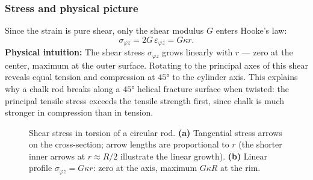 \documentclass[../main.tex]{subfiles}
\begin{document}
\subsubsection*{Stress and physical picture}

Since the strain is pure shear, only the shear modulus $G$ enters Hooke's law:
\begin{equation}
    \sigma_{\varphi z} = 2G\,\varepsilon_{\varphi z} = G\kappa r.
    \label{eq:lec08_torsion_stress}
\end{equation}
\noindent\textbf{Physical intuition:} The shear stress $\sigma_{\varphi z}$ grows linearly with $r$ — zero at the center, maximum at the outer surface. Rotating to the principal axes of this shear reveals equal tension and compression at $45°$ to the cylinder axis. This explains why a chalk rod breaks along a $45°$ helical fracture surface when twisted: the principal tensile stress exceeds the tensile strength first, since chalk is much stronger in compression than in tension.

\begin{figure}[htb]
\centering
{}
\caption{Shear stress in torsion of a circular rod. \textbf{(a)} Tangential stress arrows on the cross-section; arrow lengths are proportional to $r$ (the shorter inner arrows at $r\approx R/2$ illustrate the linear growth). \textbf{(b)} Linear profile $\sigma_{\varphi z}=G\kappa r$: zero at the axis, maximum $G\kappa R$ at the rim.}
\label{fig:lec08_torsion}
\end{figure}
\end{document}

